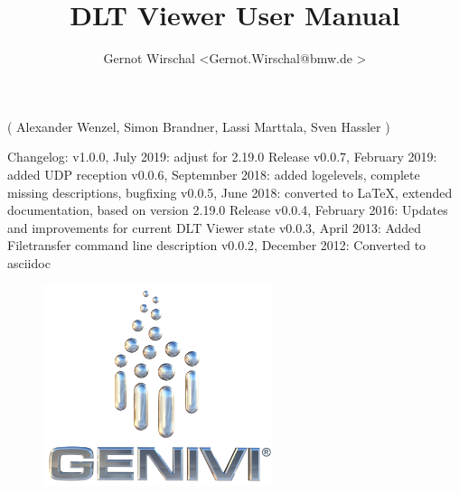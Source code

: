 \documentclass[a4paper,11pt]{article}
\begin{document}
\title{DLT Viewer User Manual}
\author{Gernot Wirschal \textless Gernot.Wirschal@bmw.de \textgreater }


\maketitle

\begin{center}
( Alexander Wenzel, Simon Brandner, Lassi Marttala, Sven Hassler ) \linebreak
\end{center}

Changelog:\linebreak
v1.0.0, July 2019: adjust for 2.19.0 Release\linebreak
v0.0.7, February 2019: added UDP reception\linebreak
v0.0.6, Septemnber 2018: added logelevels, complete missing descriptions, bugfixing \linebreak
v0.0.5, June 2018: converted to \LaTeX, extended documentation, based on version 2.19.0 Release \linebreak
v0.0.4, February 2016: Updates and improvements for current DLT Viewer state \linebreak
v0.0.3, April 2013: Added Filetransfer command line description \linebreak
v0.0.2, December 2012: Converted to asciidoc \linebreak

\vspace{3cm}

\begin{figure}[h]
    \centering
    \includegraphics[width=0.6\textwidth]{images/genivi_transparent.png}
\end{figure}

\pagebreak

\tableofcontents
\end{document}
